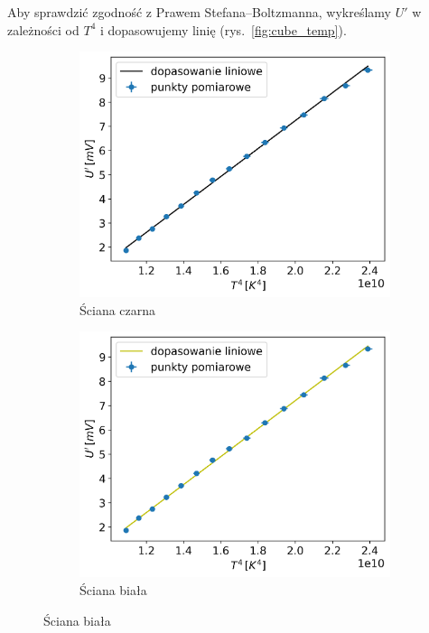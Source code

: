 \documentclass[12pt]{article}
\begin{document}
Aby sprawdzić zgodność z Prawem Stefana–Boltzmanna, wykreślamy $U'$ w zależności od $T^4$ i dopasowujemy linię (rys.~\ref{fig:cube_temp}).

\begin{figure}[H]
	\centering
	\begin{subfigure}{0.45\textwidth}
		\centering
		\includegraphics[width=\linewidth]{cube_black}
		\caption{Ściana czarna}
		\label{fig:cube_black}
	\end{subfigure}
	\hfill
	\begin{subfigure}{0.45\textwidth}
		\centering
		\includegraphics[width=\linewidth]{cube_white}
		\caption{Ściana biała}
		\label{fig:cube_white}
	\end{subfigure}


\end{figure}
\end{document}
